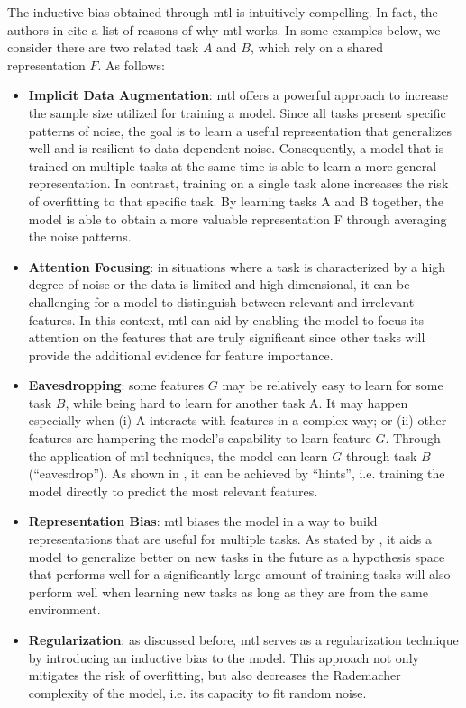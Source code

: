 The inductive bias obtained through \acs{mtl} is intuitively compelling. In fact, the authors in \citep{ruder2017overview} cite a list of reasons of why \acs{mtl} works. In some examples below, we consider there are two related task $A$ and $B$, which rely on a shared representation $F$. As follows:

\begin{itemize}
\item \textbf{Implicit Data Augmentation}: \acl{mtl} offers a powerful approach to increase the sample size utilized for training a model. Since all tasks present specific patterns of noise, the goal is to learn a useful representation that generalizes well and is resilient to data-dependent noise. Consequently, a model that is trained on multiple tasks at the same time is able to learn a more general representation. In contrast, training on a single task alone increases the risk of overfitting to that specific task. By learning tasks A and B together, the model is able  to obtain a more valuable representation F through averaging the noise patterns.

\item \textbf{Attention Focusing}: in situations where a task is characterized by a high degree of noise or the data is limited and high-dimensional, it can be challenging for a model to distinguish between relevant and irrelevant features. In this context, \acs{mtl} can aid by enabling the model to focus its attention on the features that are truly significant since other tasks will provide the additional evidence for feature importance.

\item \textbf{Eavesdropping}: some features $G$ may be relatively easy to learn for some task $B$, while being hard to learn for another task A. It may happen especially when (i) A interacts with features in a complex way; or (ii) other features are hampering the model's capability to learn feature $G$. Through the application of \acs{mtl} techniques, the model can learn $G$ through task $B$ (``eavesdrop''). As shown in \citep{abu1990learning}, it can be achieved by ``hints'', i.e. training the model directly to predict the most relevant features.

\item \textbf{Representation Bias}: \acs{mtl} biases the model in a way to build representations that are useful for multiple tasks. As stated by \cite{baxter2000model}, it aids a model to generalize better on new tasks in the future as a hypothesis space that performs well for a significantly large amount of training tasks will also perform well when learning new tasks as long as they are from the same environment.

\item \textbf{Regularization}: as discussed before, \acl{mtl} serves as a regularization technique by introducing an inductive bias to the model. This approach not only mitigates the risk of overfitting, but also decreases the Rademacher complexity of the model, i.e. its capacity to fit random noise.
\end{itemize}

